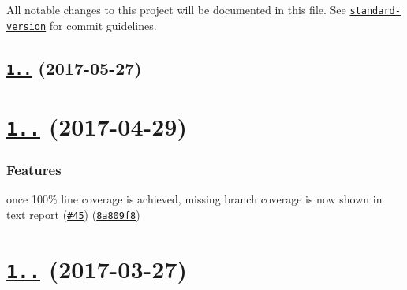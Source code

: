 All notable changes to this project will be documented in this file. See \href{https://github.com/conventional-changelog/standard-version}{\tt standard-\/version} for commit guidelines.

\label{_1.1.1}%
 \subsection*{\href{https://github.com/istanbuljs/istanbuljs/compare/istanbul-lib-report@1.1.0...istanbul-lib-report@1.1.1}{\tt 1..} (2017-\/05-\/27)}

\label{_1.1.0}%
 \section*{\href{https://github.com/istanbuljs/istanbul-lib-report/compare/istanbul-lib-report@1.0.0...istanbul-lib-report@1.1.0}{\tt 1..} (2017-\/04-\/29)}

\subsubsection*{Features}


\begin{DoxyItemize}
\item once 100\% line coverage is achieved, missing branch coverage is now shown in text report (\href{https://github.com/istanbuljs/istanbuljs/issues/45}{\tt \#45}) (\href{https://github.com/istanbuljs/istanbul-lib-report/commit/8a809f8}{\tt 8a809f8})
\end{DoxyItemize}

\label{_1.0.0}%
 \section*{\href{https://github.com/istanbuljs/istanbul-lib-report/compare/istanbul-lib-report@1.0.0-alpha.3...istanbul-lib-report@1.0.0}{\tt 1..} (2017-\/03-\/27)}